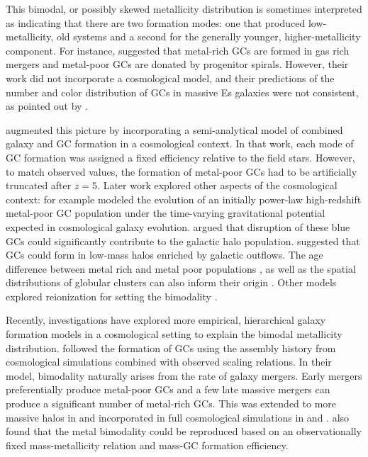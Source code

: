 \documentclass[useAMS,usenatbib]{mn2e}
\begin{document}
This bimodal, or possibly skewed metallicity distribution \citep[e.g.,][]{Gebhardt1999, Strader2003, Peng2006} is sometimes interpreted as indicating that there are two formation modes: one that produced low-metallicity, old systems and a second for the generally younger, higher-metallicity component.  For instance, \citet{Ashman1992} suggested that metal-rich GCs are formed in gas rich mergers and metal-poor GCs are donated by progenitor spirals.  However, their work did not incorporate a cosmological model, and their predictions of the number and color distribution of GCs in massive Es galaxies were not consistent, as pointed out by \citet{Forbes1997}.  

\citet{Beasley2002} augmented this picture by incorporating a semi-analytical model of combined galaxy and GC formation in a cosmological context. In that work, each mode of GC formation was assigned a fixed efficiency relative to the field stars. However, to match observed values, the formation of metal-poor GCs had to be artificially truncated after $z = 5$.  Later work explored other aspects of the cosmological context: for example \citet{Prieto2008} modeled the evolution of an initially power-law high-redshift metal-poor GC population under the time-varying gravitational potential expected in cosmological galaxy evolution.  \citet{Boley2009} argued that disruption of these blue GCs could significantly contribute to the galactic halo population.  \citet{Gray2011} suggested that GCs could form in low-mass halos enriched by galactic outflows.  The age difference between metal rich and metal poor populations \citep{Hansen2013}, as well as the spatial distributions of globular clusters can also inform their origin \citep{Hargis2014}.  Other models explored reionization for setting the bimodality \citep[e.g.,][]{Santos2003, Harris1994}  \citep[although see][]{Forbes2015}.

Recently, investigations have explored more empirical, hierarchical galaxy formation models in a cosmological setting to explain the bimodal metallicity distribution.   \citet{Muratov2010} followed the formation of GCs using the assembly history from cosmological simulations combined with observed scaling relations. In their model, bimodality naturally arises from the rate of galaxy mergers. Early mergers preferentially produce metal-poor GCs and a few late massive mergers can produce a significant number of metal-rich GCs.  This was extended to more massive halos in \citet{Li2014} and incorporated in full cosmological simulations in \citet{Li2016} and \citet{Renaud2017}.     \citet{Tonini2013} also found that the metal bimodality could be reproduced based on an observationally fixed mass-metallicity relation and mass-GC formation efficiency.  
\end{document}
